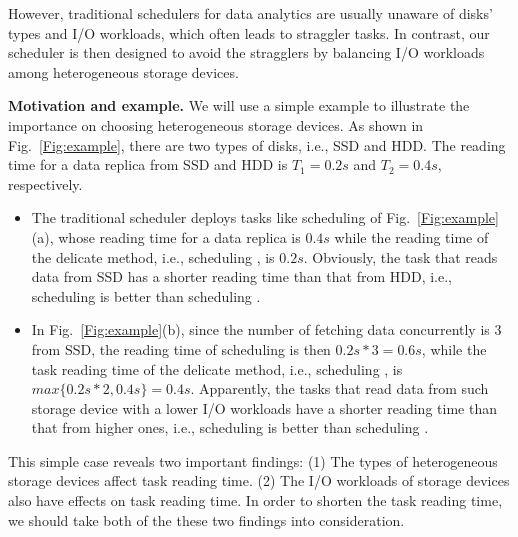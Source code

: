 \documentclass[conference]{IEEEtran}
\begin{document}
However, traditional schedulers for data analytics are usually unaware of disks' types and I/O workloads, which often leads to straggler tasks. In contrast, our scheduler is then designed to avoid the stragglers by balancing I/O workloads among heterogeneous storage devices.

\textbf{Motivation and example.}
We will use a simple example to illustrate the importance on choosing heterogeneous storage devices. As shown in Fig.~\ref{Fig:example}, there are two types of disks, i.e., SSD and HDD. The reading time for a data replica from SSD and HDD is $T_1 = 0.2s$ and $T_2 = 0.4s$, respectively. 
\begin{itemize}
	\item The traditional scheduler deploys tasks like scheduling \uppercase\expandafter{} of Fig.~\ref{Fig:example}(a), whose reading time for a data replica is $0.4s$ while the reading time of the delicate method, i.e., scheduling \uppercase\expandafter{}, is $0.2s$. Obviously, the task that reads data from SSD has a shorter reading time than that from HDD, i.e., scheduling \uppercase\expandafter{} is better than scheduling \uppercase\expandafter{}.

	\item In Fig.~\ref{Fig:example}(b), since the number of fetching data concurrently is 3 from SSD, the reading time of scheduling \uppercase\expandafter{} is then $0.2s * 3 = 0.6s$, while the task reading time of the delicate method, i.e., scheduling \uppercase\expandafter{}, is $max\{0.2s * 2, 0.4s\} = 0.4s$. Apparently, the tasks that read data from such storage device with a lower I/O workloads have a shorter reading time than that from higher ones, i.e., scheduling \uppercase\expandafter{} is better than scheduling \uppercase\expandafter{}.
\end{itemize}

This simple case reveals two important findings: (1) The types of heterogeneous storage devices affect task reading time. (2) The I/O workloads of storage devices also have effects on task reading time. In order to shorten the task reading time, we should take both of the these two findings into consideration.
\end{document}
